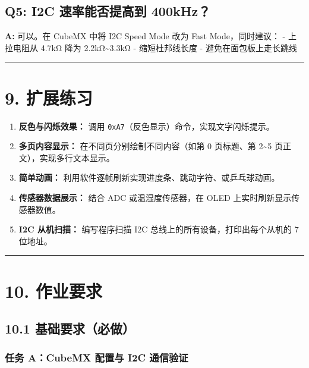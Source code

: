 \documentclass[
  chinese,
  UTF8,
  oneside,
  openany]{ctexbook}
\begin{document}
\subsection{Q5: I2C 速率能否提高到
400kHz？}\label{q5-i2c-ux901fux7387ux80fdux5426ux63d0ux9ad8ux5230-400khz}

\textbf{A:} 可以。在 CubeMX 中将 I2C Speed Mode 改为 Fast
Mode，同时建议： - 上拉电阻从 4.7kΩ 降为 2.2kΩ\textasciitilde3.3kΩ -
缩短杜邦线长度 - 避免在面包板上走长跳线

\begin{center}\rule{0.5\linewidth}{0.5pt}\end{center}

\section{9. 扩展练习}\label{ux6269ux5c55ux7ec3ux4e60-2}

\begin{enumerate}
\def\labelenumi{\arabic{enumi}.}
\item
  \textbf{反色与闪烁效果：} 调用
  \texttt{0xA7}（反色显示）命令，实现文字闪烁提示。
\item
  \textbf{多页内容显示：} 在不同页分别绘制不同内容（如第 0 页标题、第
  2\textasciitilde5 页正文），实现多行文本显示。
\item
  \textbf{简单动画：}
  利用软件逐帧刷新实现进度条、跳动字符、或乒乓球动画。
\item
  \textbf{传感器数据展示：} 结合 ADC 或温湿度传感器，在 OLED
  上实时刷新显示传感器数值。
\item
  \textbf{I2C 从机扫描：} 编写程序扫描 I2C
  总线上的所有设备，打印出每个从机的 7 位地址。
\end{enumerate}

\begin{center}\rule{0.5\linewidth}{0.5pt}\end{center}

\section{10. 作业要求}\label{ux4f5cux4e1aux8981ux6c42-1}

\subsection{10.1
基础要求（必做）}\label{ux57faux7840ux8981ux6c42ux5fc5ux505a}

\subsubsection{任务 A：CubeMX 配置与 I2C
通信验证}\label{ux4efbux52a1-acubemx-ux914dux7f6eux4e0e-i2c-ux901aux4fe1ux9a8cux8bc1}
\end{document}
